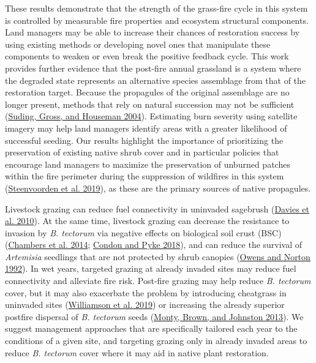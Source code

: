 \documentclass[
  12pt,
]{article}
\begin{document}
These results demonstrate that the strength of the grass-fire cycle in
this system is controlled by measurable fire properties and ecosystem
structural components. Land managers may be able to increase their
chances of restoration success by using existing methods or developing
novel ones that manipulate these components to weaken or even break the
positive feedback cycle. This work provides further evidence that the
post-fire annual grassland is a system where the degraded state
represents an alternative species assemblage from that of the
restoration target. Because the propagules of the original assemblage
are no longer present, methods that rely on natural succession may not
be sufficient (\protect\hyperlink{ref-Suding2004}{Suding, Gross, and
Houseman 2004}). Estimating burn severity using satellite imagery may
help land managers identify areas with a greater likelihood of
successful seeding. Our results highlight the importance of prioritizing
the preservation of existing native shrub cover and in particular
policies that encourage land managers to maximize the preservation of
unburned patches within the fire perimeter during the suppression of
wildfires in this system
(\protect\hyperlink{ref-Steenvoorden2019}{Steenvoorden et al. 2019}), as
these are the primary sources of native propagules.

Livestock grazing can reduce fuel connectivity in uninvaded sagebrush
(\protect\hyperlink{ref-Davies2010}{Davies et al. 2010}). At the same
time, livestock grazing can decrease the resistance to invasion by
\emph{B. tectorum} via negative effects on biological soil crust (BSC)
(\protect\hyperlink{ref-chambers_resilience_2014}{Chambers et al. 2014};
\protect\hyperlink{ref-Condon2018}{Condon and Pyke 2018}), and can
reduce the survival of \emph{Artemisia} seedlings that are not protected
by shrub canopies (\protect\hyperlink{ref-Owens1992}{Owens and Norton
1992}). In wet years, targeted grazing at already invaded sites may
reduce fuel connectivity and alleviate fire risk. Post-fire grazing may
help reduce \emph{B. tectorum} cover, but it may also exacerbate the
problem by introducing cheatgrass in uninvaded sites
(\protect\hyperlink{ref-Williamson2019}{Williamson et al. 2019}) or
increasing the already superior postfire dispersal of \emph{B. tectorum}
seeds (\protect\hyperlink{ref-Monty2013}{Monty, Brown, and Johnston
2013}). We suggest management approaches that are specifically tailored
each year to the conditions of a given site, and targeting grazing only
in already invaded areas to reduce \emph{B. tectorum} cover where it may
aid in native plant restoration.
\end{document}

